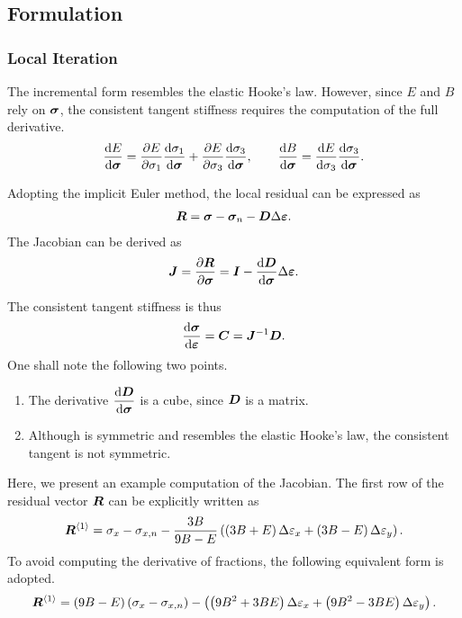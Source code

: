 \subsection{Formulation}
\subsubsection{Local Iteration}
The incremental form  resembles the elastic Hooke's law.
However, since $E$ and $B$ rely on $\bm{\sigma}$, the consistent tangent stiffness requires the computation of the full derivative.
\begin{gather}
\dfrac{\mathrm{d}E}{\mathrm{d}\bm{\sigma}}=\dfrac{\partial{E}}{\partial{\sigma_1}}\dfrac{\mathrm{d}\sigma_1}{\mathrm{d}\bm{\sigma}}+\dfrac{\partial{E}}{\partial{\sigma_3}}\dfrac{\mathrm{d}\sigma_3}{\mathrm{d}\bm{\sigma}},\qquad
\dfrac{\mathrm{d}B}{\mathrm{d}\bm{\sigma}}=\dfrac{\mathrm{d}E}{\mathrm{d}\sigma_3}\dfrac{\mathrm{d}\sigma_3}{\mathrm{d}\bm{\sigma}}.
\end{gather}

Adopting the implicit Euler method, the local residual can be expressed as
\begin{gather}
\bm{R}=\bm{\sigma}-\bm{\sigma}_n-\bm{D}\Delta\bm{\varepsilon}.
\end{gather}
The Jacobian can be derived as
\begin{gather}
\bm{J}=\dfrac{\partial{\bm{R}}}{\partial{\bm{\sigma}}}=\bm{I}-\dfrac{\mathrm{d}\bm{D}}{\mathrm{d}\bm{\sigma}}\Delta\bm{\varepsilon}.
\end{gather}

The consistent tangent stiffness is thus
\begin{gather}
\dfrac{\mathrm{d}\bm{\sigma}}{\mathrm{d}\bm{\varepsilon}}=\bm{C}=\bm{J}^{-1}\bm{D}.
\end{gather}
One shall note the following two points.
\begin{enumerate}
\item The derivative $\dfrac{\mathrm{d}\bm{D}}{\mathrm{d}\bm{\sigma}}$ is a cube, since $\bm{D}$ is a matrix.
\item Although  is symmetric and resembles the elastic Hooke's law, the consistent tangent is not symmetric.
\end{enumerate}

Here, we present an example computation of the Jacobian. The first row of the residual vector $\bm{R}$ can be explicitly written as
\begin{gather}
\bm{R}^{\left\langle1\right\rangle}=\sigma_x-\sigma_{x,n}-\dfrac{3B}{9B-E}\left(\left(3B+E\right)\Delta\varepsilon_x+\left(3B-E\right)\Delta\varepsilon_y\right).
\end{gather}
To avoid computing the derivative of fractions, the following equivalent form is adopted.
\begin{gather}
\bm{R}^{\left\langle1\right\rangle}=\left(9B-E\right)\left(\sigma_x-\sigma_{x,n}\right)-\left(\left(9B^2+3BE\right)\Delta\varepsilon_x+\left(9B^2-3BE\right)\Delta\varepsilon_y\right).
\end{gather}

